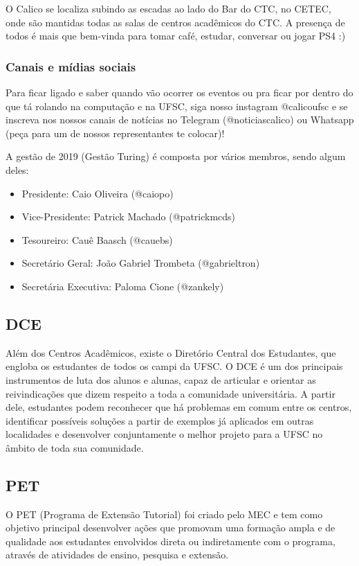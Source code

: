 \documentclass{article}
\begin{document}
O Calico se localiza subindo as escadas ao lado do Bar do CTC, no CETEC, onde são mantidas todas as salas de centros acadêmicos do CTC. A presença de todos é mais que bem-vinda para tomar café, estudar, conversar ou jogar PS4 :)
\subsubsection{Canais e mídias sociais}
Para ficar ligado e saber quando vão ocorrer os eventos ou pra ficar por dentro do que tá rolando na computação e na UFSC, siga nosso instagram @calicoufsc e se inscreva nos nossos canais de notícias no Telegram (@noticiascalico) ou Whatsapp (peça para um de nossos representantes te colocar)!

A gestão de 2019 (Gestão Turing) é composta por vários membros, sendo algum deles:
\begin{itemize}
\item Presidente: Caio Oliveira (@caiopo)
\item Vice-Presidente: Patrick Machado (@patrickmcds)
\item Tesoureiro: Cauê Baasch (@cauebs)
\item Secretário Geral: João Gabriel Trombeta (@gabrieltron)
\item Secretária Executiva: Paloma Cione (@zankely)
\end{itemize}
\subsection{DCE}
Além dos Centros Acadêmicos, existe o Diretório Central dos Estudantes, que engloba os estudantes de todos os campi da UFSC. O DCE é um dos principais instrumentos de luta dos
alunos e alunas, capaz de articular e orientar as reivindicações que dizem respeito a toda a
comunidade universitária. A partir dele, estudantes podem reconhecer que há problemas em
comum entre os centros, identificar possíveis soluções a partir de exemplos já aplicados em
outras localidades e desenvolver conjuntamente o melhor projeto para a UFSC no âmbito de
toda sua comunidade.

\subsection{PET}
O PET (Programa de Extensão Tutorial) foi criado pelo MEC e tem como objetivo principal desenvolver ações que promovam uma formação ampla e de qualidade aos estudantes envolvidos direta ou indiretamente com o programa, através de atividades de ensino, pesquisa e extensão.
\end{document}
